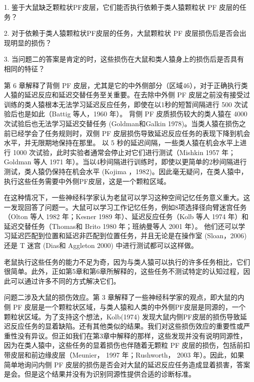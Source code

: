 \par 
1. 鉴于大鼠缺乏颗粒状PF皮层，它们能否执行依赖于类人猿颗粒状 PF 皮层的任务？ 
\par 
2. 对于依赖于类人猿颗粒状PF皮层的任务，大鼠颗粒状 PF 皮层损伤后是否会出现明显的损伤？
\par 
3. 当问题二的答案是肯定的时，这些损伤在大鼠和类人猿身上的损伤后是否具有相同的特征？
\par 
第 6 章解释了背侧 PF 皮层，尤其是它的中外侧部分（区域46），对于正确执行类人猿的延迟反应和延迟交替任务至关重要。在去除中外侧 PF 皮层之前没有接受过训练的类人猿根本无法学习延迟反应任务，即使在以1秒的短暂间隔进行 500 次试验后也是如此（Battig 等人，1960 年）。 背侧 PF 皮质损伤较大的类人猿在 4000 次试验后也无法学习延迟交替任务 (Goldman和Galkin 1978)。当类人猿在损伤之前已经学会了任务规则时，双侧 PF 皮层损伤导致延迟反应任务的表现下降到机会水平，并无限期地保持在那里。 以 5 秒的延迟间隔，一些类人猿在机会水平上进行 1000 次试验，此时实验者通常会停止对它们进行测试（Mishkin 1957 年；Goldman 等人 1971 年）。当以4秒间隔进行训练时，即使以更简单的2秒间隔进行测试，类人猿仍保持在机会水平 (Kojima ，1982)。因此毫无疑问，在类人猿中，执行这些任务需要中外侧PF皮层，这是一个颗粒区域。
\par 
在这种情况下，一些神经科学家认为老鼠可以学习这种空间记忆任务意义重大。这一发现回答了问题一。大鼠可以学习工作记忆任务，例如8项选择径向臂迷宫任务（Olton 等人 1982 年；Kesner 1989 年）、延迟反应任务（Kolb 等人 1974 年）和延迟交替任务（Thomas和 Brito 1980 年；班纳曼等人 2001 年）。 他们还可以学习延迟匹配到位置和延迟非匹配到位置任务，并且无论是在操作室 (Sloan，2006) 还是 T 迷宫 (Dias和 Aggleton 2000) 中进行测试都可以这样做。
\par 
老鼠执行这些任务的能力不足为奇，因为与类人猿可以执行的许多任务相比，它们很简单。此外，正如第5章和第6章所解释的，这些任务不测试特定的认知过程，因此可以通过许多不同的方式解决它们。
\par 
问题二涉及大鼠的损伤效应。第 3 章解释了一些神经科学家的观点，即大鼠的内侧 PF 皮层是一个颗粒状区域，与类人猿和人类的中外侧PF皮层是同源的，一个颗粒状区域。为了支持这个想法，Kolb(1974) 发现大鼠内侧PF皮层的损伤导致延迟反应任务的显着缺陷。还有其他类似的结果。我们对这些损伤效应的重要性或严重性没有异议。但正如我们在第3章中解释的那样，这些发现并没有说明同源性，因为在类人猿中，这些任务的显着损伤也伴随着无颗粒 PF 皮层的损伤，包括前扣带皮层和前边缘皮层（Meunier， 1997 年；Rushworth， 2003 年）。因此，如果简单地询问内侧 PF 皮层的损伤是否会对大鼠的延迟反应任务造成显着损害，答案是会。但是这个结果并没有为识别同源性提供合适的诊断标准。
\par 
